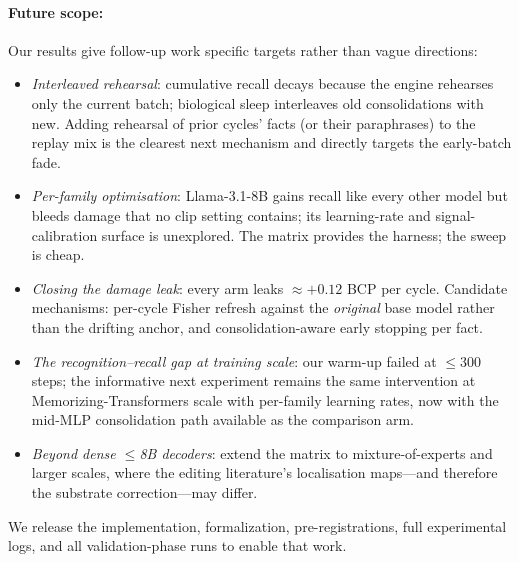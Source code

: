 \paragraph{Future scope:}
Our results give follow-up work specific targets rather than vague directions:

\begin{itemize}[leftmargin=2.4em,itemsep=0.15em,topsep=0.2em]
    \item[(i)] \emph{Interleaved rehearsal}: cumulative recall decays because the engine rehearses only the current batch; biological sleep interleaves old consolidations with new. Adding rehearsal of prior cycles' facts (or their paraphrases) to the replay mix is the clearest next mechanism and directly targets the early-batch fade.
    \item[(ii)] \emph{Per-family optimisation}: Llama-3.1-8B gains recall like every other model but bleeds damage that no clip setting contains; its learning-rate and signal-calibration surface is unexplored. The matrix provides the harness; the sweep is cheap.
    \item[(iii)] \emph{Closing the damage leak}: every arm leaks $\approx +0.12$ BCP per cycle. Candidate mechanisms: per-cycle Fisher refresh against the \emph{original} base model rather than the drifting anchor, and consolidation-aware early stopping per fact.
    \item[(iv)] \emph{The recognition--recall gap at training scale}: our warm-up failed at $\leq$300 steps; the informative next experiment remains the same intervention at Memorizing-Transformers scale with per-family learning rates, now with the mid-MLP consolidation path available as the comparison arm.
    \item[(v)] \emph{Beyond dense $\leq$8B decoders}: extend the matrix to mixture-of-experts and larger scales, where the editing literature's localisation maps---and therefore the substrate correction---may differ.
\end{itemize}

We release the implementation, formalization, pre-registrations, full experimental logs, and all validation-phase runs to enable that work.
